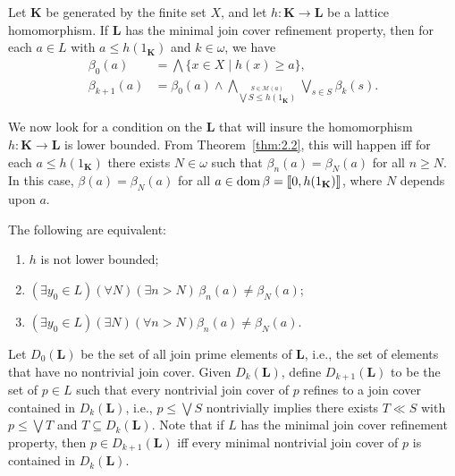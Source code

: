 \begin{theorem}\label{thm:2.4}
Let $\mathbf K$ be generated by the finite set $X$, and let 
$h \colon \mathbf K \to \mathbf L$ be a lattice homomorphism. 
If $\mathbf L$ has the minimal join cover refinement property, then
for each $a \in L$ with $a \leq h(1_{\mathbf K})$ and $k\in \omega$, we have
\begin{align*}
    \beta_0(a) &= \bigwedge \{x \in X \mid h (x) \geq a\},\\
    \beta_{k+1}(a) &= \beta_0(a) \wedge 
    \bigwedge_{\stackrel{S \in \mathcal M (a)}{\bigvee S \leq h(1_{\mathbf K})}}
    \bigvee_{s \in S} \beta_k(s).
\end{align*}
\end{theorem}

We now look for a condition on the $\mathbf L$ that will insure the 
homomorphism $h \colon \mathbf K \to \mathbf L$ is lower bounded. From 
Theorem~\ref{thm:2.2}, this will happen iff for each 
$a \leq h(1_{\mathbf K})$ there exists $N \in \omega$ such
that $\beta_n(a) = \beta_N(a)$ for all $n \geq N$. In this case, 
$\beta(a) = \beta_N(a)$ for all $a\in \operatorname{dom} \beta = \llbracket 0, h(1_{\mathbf K})\rrbracket$, 
where $N$ depends upon $a$.

\begin{fact}
\label{fact:1}
The following are equivalent:
\begin{enumerate}
  \item $h$ is not lower bounded;
  \item $(\exists y_0 \in L)(\forall N)(\exists n> N)\, \beta_n(a) \neq \beta_N(a)$;
  \item $(\exists y_0 \in L)(\exists N)(\forall n> N) \beta_n(a) \neq \beta_N(a)$.
\end{enumerate}
\end{fact}

Let $D_0(\mathbf L)$ be the set of all join prime elements of $\mathbf L$, 
i.e., the set of elements that have no nontrivial join cover. 
Given $D_k(\mathbf L)$, define $D_{k+1}(\mathbf L)$ to be the set of $p \in L$ 
such that every nontrivial join cover of $p$ refines to a join cover 
contained in $D_k(\mathbf L)$, i.e., $p \leq \bigvee S$ nontrivially implies 
there exists $T \ll S$ with $p \leq \bigvee T$ and $T \subseteq D_k(\mathbf L)$. 
Note that if $L$ has the minimal join cover refinement property, then 
$p \in D_{k+1}(\mathbf L)$ iff every minimal nontrivial join
cover of $p$ is contained in $D_k(\mathbf L)$.

